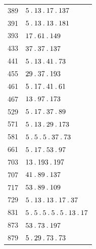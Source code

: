 \begin{longtable}{@{}r|l@{}}
389 & $5\mathbin{.} 13\mathbin{.} 17\mathbin{.} 137$\\
391 & $5\mathbin{.} 13\mathbin{.} 13\mathbin{.} 181$\\
393 & $17\mathbin{.} 61\mathbin{.} 149$\\
433 & $37\mathbin{.} 37\mathbin{.} 137$\\
441 & $5\mathbin{.} 13\mathbin{.} 41\mathbin{.} 73$\\
455 & $29\mathbin{.} 37\mathbin{.} 193$\\
461 & $5\mathbin{.} 17\mathbin{.} 41\mathbin{.} 61$\\
467 & $13\mathbin{.} 97\mathbin{.} 173$\\
529 & $5\mathbin{.} 17\mathbin{.} 37\mathbin{.} 89$\\
571 & $5\mathbin{.} 13\mathbin{.} 29\mathbin{.} 173$\\
581 & $5\mathbin{.} 5\mathbin{.} 5\mathbin{.} 37\mathbin{.} 73$\\
661 & $5\mathbin{.} 17\mathbin{.} 53\mathbin{.} 97$\\
703 & $13\mathbin{.} 193\mathbin{.} 197$\\
707 & $41\mathbin{.} 89\mathbin{.} 137$\\
717 & $53\mathbin{.} 89\mathbin{.} 109$\\
729 & $5\mathbin{.} 13\mathbin{.} 13\mathbin{.} 17\mathbin{.} 37$\\
831 & $5\mathbin{.} 5\mathbin{.} 5\mathbin{.} 5\mathbin{.} 5\mathbin{.} 13\mathbin{.} 17$\\
873 & $53\mathbin{.} 73\mathbin{.} 197$\\
879 & $5\mathbin{.} 29\mathbin{.} 73\mathbin{.} 73$\\
\end{longtable}\endgroup
